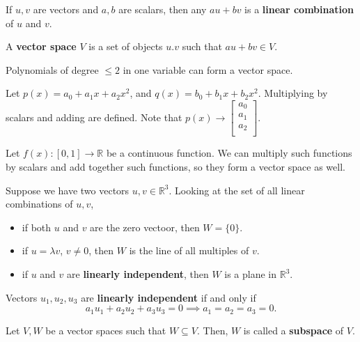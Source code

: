 \begin{definition}
	If \( u,v \) are vectors and \( a,b \) are scalars, then any \( au+bv \) is a \textbf{linear combination} of \( u \) and \( v \).
\end{definition}

\begin{remark}
	A \textbf{vector space} \( V \) is a set of objects \( u.v \) such that \( au+bv \in V\).
\end{remark}

\begin{eg}
	Polynomials of degree \( \le 2 \) in one variable can form a vector space.
\end{eg}
\begin{explanation}
	Let \( p(x) = a_{0}+a_{1}x+a_{2}x^2 \), and \( q(x) = b_{0}+b_{1}x+b_{2}x^2  \). Multiplying by scalars and adding are defined. Note that \( p(x) \to \begin{bmatrix}
		a_{0}\\
		a_{1}\\
		a_{2}\\
	\end{bmatrix} \).
\end{explanation}

\begin{eg}
	Let \( f(x) : [0,1] \to \mathbb{R} \) be a continuous function. We can multiply such functions by scalars and add together such functions, so they form a vector space as well.
\end{eg}

Suppose we have two vectors \( u, v \in \mathbb{R}^3\). Looking at the set of all linear combinations of \( u,v \),
\begin{itemize}
	\item if both \( u \) and \( v \) are the zero vectoor, then \( W=\{0\}   \).
	\item if \( u = \lambda v \), \( v\neq 0 \), then \( W \) is the line of all multiples of \( v \).
	\item if \( u \) and \( v \) are \textbf{linearly independent}, then \( W \) is a plane in \( \mathbb{R}^3 \).
\end{itemize}

\begin{definition}
	Vectors \( u_{1},u_{2},u_{3} \) are \textbf{linearly independent} if and only if \[
		a_{1}u_{1} + a_{2}u_{2} + a_{3}u_{3} = 0 \implies a_{1}=a_{2}=a_{3}=0
	.\] 
\end{definition}

\begin{definition}
  Let \( V,W \) be a vector spaces such that \( W \subseteq V \). Then, \( W \) is called a \textbf{subspace} of \( V \).
\end{definition}

